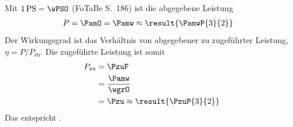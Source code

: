 Mit $1\,\mathrm{PS} = \wPSO$ (FoTaBe S.~186) ist die abgegebene Leistung
\begin{align}
 P &= \PamO = \Pamw \approx \result{\PamwP{3}{2}}
\end{align}
Der Wirkungsgrad ist das Verhältnis von abgegebener zu zugeführter Leistung, $\eta = P/P_\mathrm{zu}$. Die zugeführte Leistung ist somit
\begin{align}
 P_\mathrm{zu} &= \PzuF \\
   &= \frac{\Pamw}{\wgrO} \\
   &= \Pzu \approx \result{\PzuP{3}{2}}
\end{align}
Das entspricht .
